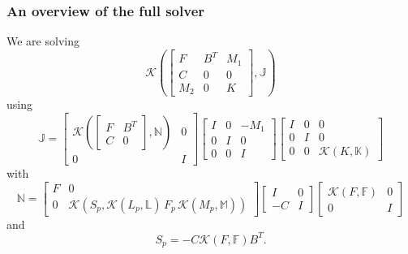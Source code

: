 \documentclass[presentation]{beamer}
\newcommand{\KSP}[2]{\ensuremath{\mathcal{K}\left(#1, \mathbb{#2}\right)}}
\newcommand{\ksp}[1]{\KSP{#1}{#1}}
\begin{document}
\begin{frame}
  \frametitle{An overview of the full solver}
  We are solving
  \begin{equation*}
    \KSP{\begin{bmatrix}
        F & B^T & M_1\\
        C & 0 & 0 \\
        M_2 & 0 & K
      \end{bmatrix}}{J}
  \end{equation*}
  using
  \begin{equation*}
    \mathbb{J} =
    \begin{bmatrix}
      \KSP{\begin{bmatrix}
          F & B^T\\
          C & 0
        \end{bmatrix}}{N} & 0\\
      0 & I
    \end{bmatrix}
    \begin{bmatrix}
      I & 0 & -M_1\\
      0 & I & 0 \\
      0 & 0 & I
    \end{bmatrix}
    \begin{bmatrix}
      I & 0 & 0\\
      0 & I & 0\\
      0 & 0 &\ksp{K}
    \end{bmatrix}
  \end{equation*}
  with
  \begin{equation*}
    \mathbb{N} = \begin{bmatrix}
      F & 0 \\
      0 & \mathcal{K}(S_p, \KSP{L_p}{L}\,F_p \, \KSP{M_p}{M})
    \end{bmatrix}
    \begin{bmatrix}
      I & 0\\
      -C & I
    \end{bmatrix}
    \begin{bmatrix}
      \ksp{F} & 0 \\
      0 & I
    \end{bmatrix}
  \end{equation*}
  and
  \begin{equation*}
    S_p = -C \ksp{F} B^T.
  \end{equation*}
\end{frame}
\end{document}
